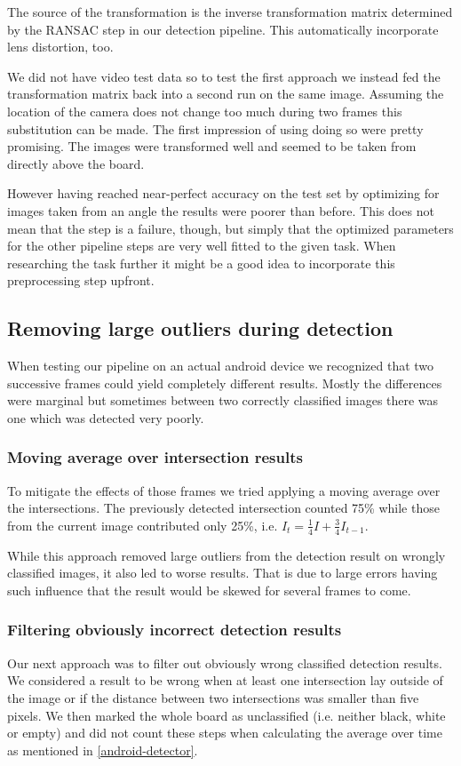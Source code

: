 	The source of the transformation is the inverse transformation matrix determined by the RANSAC step in our detection pipeline. This automatically incorporate lens distortion, too.

	We did not have video test data so to test the first approach we instead fed the transformation matrix back into a second run on the same image. Assuming the location of the camera does not change too much during two frames this substitution can be made. The first impression of using doing so were pretty promising. The images were transformed well and seemed to be taken from directly above the board.

	However having reached near-perfect accuracy on the test set by optimizing for images taken from an angle the results were poorer than before. This does not mean that the step is a failure, though, but simply that the optimized parameters for the other pipeline steps are very well fitted to the given task. When researching the task further it might be a good idea to incorporate this preprocessing step upfront.

	\subsection{Removing large outliers during detection}
	\label{evaluation-prepostprocessing-filteringOutliers}
	When testing our pipeline on an actual android device we recognized that two successive frames could yield completely different results. Mostly the differences were marginal but sometimes between two correctly classified images there was one which was detected very poorly.

	\subsubsection{Moving average over intersection results}
	\label{evaluation-prepostprocessing-filteringOutliers-movingAverage}
	To mitigate the effects of those frames we tried applying a moving average over the intersections. The previously detected intersection counted 75\% while those from the current image contributed only 25\%, i.e. $I_t = \frac{1}{4}I + \frac{3}{4}I_{t-1}$.

	While this approach removed large outliers from the detection result on wrongly classified images, it also led to worse results. That is due to large errors having such influence that the result would be skewed for several frames to come.

	\subsubsection{Filtering obviously incorrect detection results}
	\label{evaluation-prepostprocessing-filteringOutliers-filteringWrong}
	Our next approach was to filter out obviously wrong classified detection results. We considered a result to be wrong when at least one intersection lay outside of the image or if the distance between two intersections was smaller than five pixels. We then marked the whole board as unclassified (i.e. neither black, white or empty) and did not count these steps when calculating the average over time as mentioned in \autoref{android-detector}.

